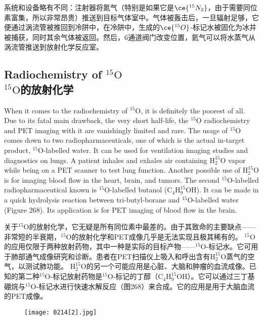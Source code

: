 \documentclass[dvipsnames, svgnames,a4paper,11pt]{article}
\begin{document}
系统和设备略有不同：注射器将氮气（特别是如果它是\(\ce{^{15}N_2}\)，由于需要同位素富集，所以非常昂贵）推送到目标气体室中。气体被轰击后，一旦辐射足够，它便通过涡流管被推回到冷阱中，在冷阱中，生成的\(\ce{^{15}O}\)-标记水被固化为冰并被捕获，同时其余气体被返回。然后，6通道阀门改变位置，氦气可以将水蒸气从涡流管推送到放射化学反应室。



\subsection{Radiochemistry of \(\mathrm{^{15}O}\)\\ \(\mathrm{^{15}O}\)的放射化学}  
When it comes to the radiochemistry of \(\mathrm{^{15}O}\), it is definitely the poorest of all. Due to its fatal main drawback, the very short half-life, the \(\mathrm{^{15}O}\) radiochemistry and PET imaging with it are vanishingly limited and rare. The usage of \(\mathrm{^{15}O}\) comes down to two radiopharmaceuticals, one of which is the actual in-target product, \(\mathrm{^{15}O}\)-labelled water. It can be used for ventilation imaging studies and diagnostics on lungs. A patient inhales and exhales air containing \(\mathrm{H_{2}^{15}O}\) vapor while being on a PET scanner to test lung function. Another possible use of \(\mathrm{H_{2}^{15}O}\) is for imaging blood flow in the heart, brain, and tumors. The second \(\mathrm{^{15}O}\)-labelled radiopharmaceutical known is \(\mathrm{^{15}O}\)-labelled butanol (\(\mathrm{C_4H_9^{15}OH}\)). It can be made in a quick hydrolysis reaction between tri-butyl-borane and \(\mathrm{^{15}O}\)-labelled water (Figure 268). Its application is for PET imaging of blood flow in the brain.

关于\(\mathrm{^{15}O}\)的放射化学，它无疑是所有同位素中最差的。由于其致命的主要缺点——非常短的半衰期，\(\mathrm{^{15}O}\)的放射化学和PET成像几乎是无法实现且极其稀有的。 \(\mathrm{^{15}O}\)的应用仅限于两种放射药物，其中一种是实际的目标产物——\(\mathrm{^{15}O}\)-标记水。它可用于肺部通气成像研究和诊断。患者在PET扫描仪上吸入和呼出含有\(\mathrm{H_2^{15}O}\)蒸气的空气，以测试肺功能。 \(\mathrm{H_2^{15}O}\)的另一个可能应用是心脏、大脑和肿瘤的血流成像。已知的第二种\(\mathrm{^{15}O}\)-标记放射药物是\(\mathrm{^{15}O}\)-标记的丁醇（\(\mathrm{C_4H_9^{15}OH}\)）。它可以通过三丁基硼烷与\(\mathrm{^{15}O}\)-标记水进行快速水解反应（图268）来合成。它的应用是用于大脑血流的PET成像。

\begin{figure}[h]
	\centering
    \texttt{[image: 0214[2].jpg]}  
     \label{fig268}
\end{figure}
\end{document}
